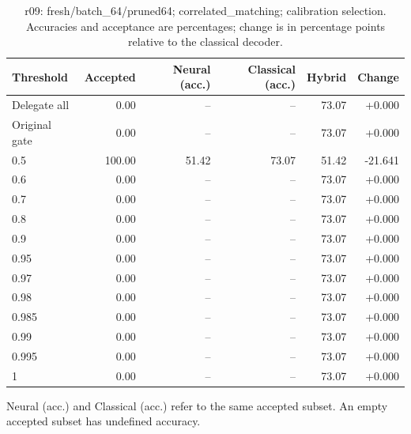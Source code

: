 \begin{table}[htbp]
\centering\small
\setlength{\tabcolsep}{3pt}
\caption{r09: fresh/batch\_64/pruned64; correlated\_matching; calibration selection. Accuracies and acceptance are percentages; change is in percentage points relative to the classical decoder.}
\begin{tabular}{lrrrrr}
\toprule
Threshold & Accepted & Neural (acc.) & Classical (acc.) & Hybrid & Change \\
\midrule
Delegate all & 0.00 & -- & -- & 73.07 & +0.000 \\
Original gate & 0.00 & -- & -- & 73.07 & +0.000 \\
0.5 & 100.00 & 51.42 & 73.07 & 51.42 & -21.641 \\
0.6 & 0.00 & -- & -- & 73.07 & +0.000 \\
0.7 & 0.00 & -- & -- & 73.07 & +0.000 \\
0.8 & 0.00 & -- & -- & 73.07 & +0.000 \\
0.9 & 0.00 & -- & -- & 73.07 & +0.000 \\
0.95 & 0.00 & -- & -- & 73.07 & +0.000 \\
0.97 & 0.00 & -- & -- & 73.07 & +0.000 \\
0.98 & 0.00 & -- & -- & 73.07 & +0.000 \\
0.985 & 0.00 & -- & -- & 73.07 & +0.000 \\
0.99 & 0.00 & -- & -- & 73.07 & +0.000 \\
0.995 & 0.00 & -- & -- & 73.07 & +0.000 \\
1 & 0.00 & -- & -- & 73.07 & +0.000 \\
\bottomrule
\end{tabular}
\par\smallskip\footnotesize Neural (acc.) and Classical (acc.) refer to the same accepted subset. An empty accepted subset has undefined accuracy.
\end{table}
